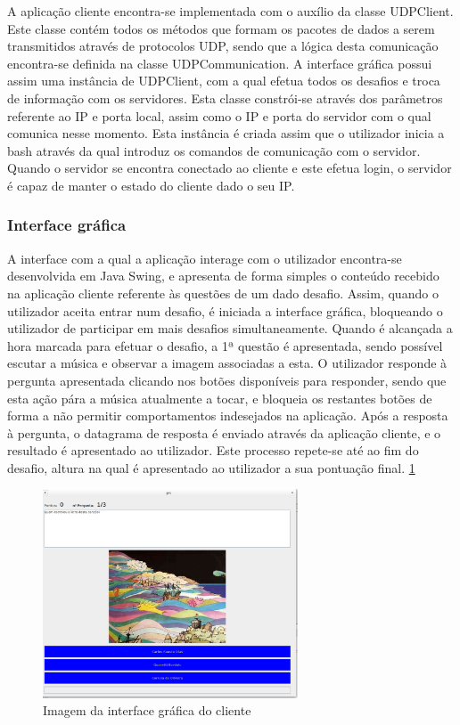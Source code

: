 \documentclass[runningheads,a4paper]{llncs}
\begin{document}
A aplicação cliente encontra-se implementada com o auxílio da classe UDPClient. Este classe contém todos os métodos que formam os pacotes de dados a serem transmitidos através de protocolos UDP, sendo que a lógica desta comunicação encontra-se definida na classe UDPCommunication. A interface gráfica possui assim uma instância de UDPClient, com a qual efetua todos os desafios e troca de informação com os servidores. Esta classe constrói-se através dos parâmetros referente ao IP e porta local, assim como o IP e porta do servidor com o qual comunica nesse momento. Esta instância é criada assim que o utilizador inicia a bash através da qual introduz os comandos de comunicação com o servidor. Quando o servidor se encontra conectado ao cliente e este efetua login, o servidor é capaz de manter o estado do cliente dado o seu IP. 

\subsubsection{Interface gráfica}

A interface com a qual a aplicação interage com o utilizador encontra-se desenvolvida em Java Swing, e apresenta de forma simples o conteúdo recebido na aplicação cliente referente às questões de um dado desafio. Assim, quando o utilizador aceita entrar num desafio, é iniciada a interface gráfica, bloqueando o utilizador de participar em mais desafios simultaneamente. Quando é alcançada a hora marcada para efetuar o desafio, a 1ª questão é apresentada, sendo possível escutar a música e observar a imagem associadas a esta. O utilizador responde à pergunta apresentada clicando nos botões disponíveis para responder, sendo que esta ação pára a música atualmente a tocar, e bloqueia os restantes botões de forma a não permitir comportamentos indesejados na aplicação. Após a resposta à pergunta, o datagrama de resposta é enviado através da aplicação cliente, e o resultado é apresentado ao utilizador. Este processo repete-se até ao fim do desafio, altura na qual é apresentado ao utilizador a sua pontuação final. 
\ref{fig:interface}

\begin{figure}
\centering
\includegraphics[height=6.2cm]{interaface.png}
\caption{Imagem da interface gráfica do cliente}
\label{fig:interface}
\end{figure}
\end{document}
